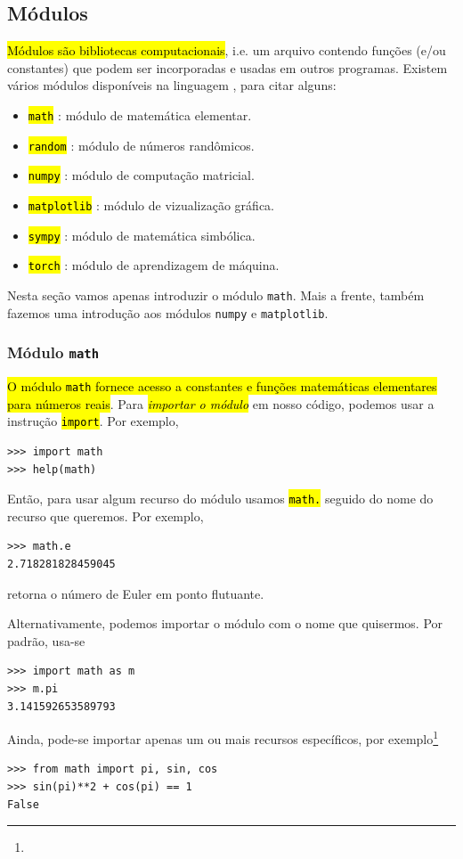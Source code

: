 \subsection{Módulos}

\hl{Módulos são bibliotecas computacionais}, i.e. um arquivo contendo funções (e/ou constantes) que podem ser incorporadas e usadas em outros programas. Existem vários módulos disponíveis na linguagem {\python}, para citar alguns:
\begin{itemize}
\item \hl{{\lstinline+math+}} : módulo de matemática elementar.
\item \hl{{\lstinline+random+}} : módulo de números randômicos.
\item \hl{{\lstinline+numpy+}} : módulo de computação matricial.
\item \hl{{\lstinline+matplotlib+}} : módulo de vizualização gráfica.
\item \hl{{\lstinline+sympy+}} : módulo de matemática simbólica.
\item \hl{{\lstinline+torch+}} : módulo de aprendizagem de máquina.
\end{itemize}

Nesta seção vamos apenas introduzir o módulo \lstinline+math+. Mais a frente, também fazemos uma introdução aos módulos \lstinline+numpy+ e \lstinline+matplotlib+.

\subsubsection{Módulo \lstinline+math+}

\hl{O módulo {\lstinline+math+} fornece acesso a constantes e funções matemáticas elementares para números reais}. Para \hl{\emph{importar o módulo}} em nosso código, podemos usar a instrução \hl{{\lstinline+import+}}. Por exemplo,
\begin{lstlisting}
>>> import math
>>> help(math)
\end{lstlisting}
Então, para usar algum recurso do módulo usamos \hl{{\lstinline+math.+}} seguido do nome do recurso que queremos. Por exemplo,
\begin{lstlisting}
>>> math.e
2.718281828459045
\end{lstlisting}
retorna o número de Euler{\euler} em ponto flutuante.

Alternativamente, podemos importar o módulo com o nome que quisermos. Por padrão, usa-se
\begin{lstlisting}
>>> import math as m
>>> m.pi
3.141592653589793
\end{lstlisting}
Ainda, pode-se importar apenas um ou mais recursos específicos, por exemplo\footnote{}
\begin{lstlisting}
>>> from math import pi, sin, cos
>>> sin(pi)**2 + cos(pi) == 1
False
\end{lstlisting}


